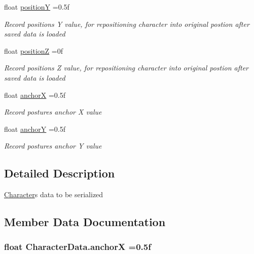 \begin{DoxyCompactItemize}
float \hyperlink{class_character_data_afca4055a2ea3f98e02d9ad4b4d7ece5d}{positionY} =0.\+5f
\begin{DoxyCompactList}\small\item\em Record position\textquotesingle{}s Y value, for repositioning character into original postion after saved data is loaded \end{DoxyCompactList}\item 
float \hyperlink{class_character_data_a88c4b72ebafe15f4a94efecf4cc234bf}{positionZ} =0f
\begin{DoxyCompactList}\small\item\em Record position\textquotesingle{}s Z value, for repositioning character into original postion after saved data is loaded \end{DoxyCompactList}\item 
float \hyperlink{class_character_data_a2daf6a93b82267bb7e27cb86582a5bf9}{anchorX} =0.\+5f
\begin{DoxyCompactList}\small\item\em Record posture\textquotesingle{}s anchor X value \end{DoxyCompactList}\item 
float \hyperlink{class_character_data_a4ae5f8442fd6f7cda7b9230a26efb192}{anchorY} =0.\+5f
\begin{DoxyCompactList}\small\item\em Record posture\textquotesingle{}s anchor Y value \end{DoxyCompactList}\end{DoxyCompactItemize}


\subsection{Detailed Description}
\hyperlink{class_character}{Character}\textquotesingle{}s data to be serialized 



\subsection{Member Data Documentation}
\subsubsection[{\texorpdfstring{anchorX}{anchorX}}]{\setlength{\rightskip}{0pt plus 5cm}float Character\+Data.\+anchorX =0.\+5f}\hypertarget{class_character_data_a2daf6a93b82267bb7e27cb86582a5bf9}{}\label{class_character_data_a2daf6a93b82267bb7e27cb86582a5bf9}


